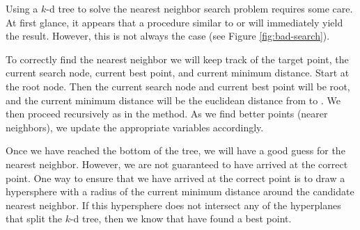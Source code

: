 Using a $k$-d tree to solve the nearest neighbor search problem requires some care.
At first glance, it appears that a procedure similar to  or  will immediately yield the result.
However, this is not always the case (see Figure \ref{fig:bad-search}).

To correctly find the nearest neighbor we will keep track of the target point, the current search node, current best point, and current minimum distance.
Start at the root node.
Then the current search node and current best point will be root, and the current minimum distance will be the euclidean distance from  to .
We then proceed recursively as in the  method.
As we find better points (nearer neighbors), we update the appropriate variables accordingly.

Once we have reached the bottom of the tree, we will have a good guess for the nearest neighbor.
However, we are not guaranteed to have arrived at the correct point.
One way to ensure that we have arrived at the correct point is to draw a hypersphere with a radius of the current minimum distance around the candidate nearest neighbor.
If this hypersphere does not intersect any of the hyperplanes that split the $k$-d tree, then we know that have found a best point.


